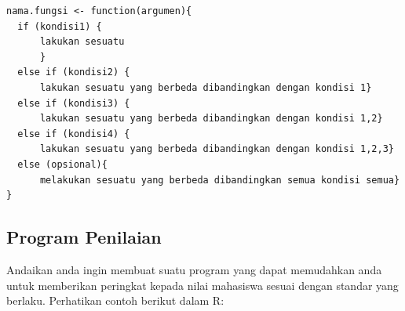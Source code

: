 \documentclass[
]{book}
\begin{document}
\begin{verbatim}
nama.fungsi <- function(argumen){
  if (kondisi1) {
      lakukan sesuatu 
      } 
  else if (kondisi2) {
      lakukan sesuatu yang berbeda dibandingkan dengan kondisi 1} 
  else if (kondisi3) {
      lakukan sesuatu yang berbeda dibandingkan dengan kondisi 1,2} 
  else if (kondisi4) {
      lakukan sesuatu yang berbeda dibandingkan dengan kondisi 1,2,3} 
  else (opsional){
      melakukan sesuatu yang berbeda dibandingkan semua kondisi semua}
}
\end{verbatim}

\hypertarget{program-penilaian}{%
\subsection{Program Penilaian}\label{program-penilaian}}

Andaikan anda ingin membuat suatu program yang dapat memudahkan anda untuk memberikan peringkat kepada nilai mahasiswa sesuai dengan standar yang berlaku. Perhatikan contoh berikut dalam R:
\end{document}
